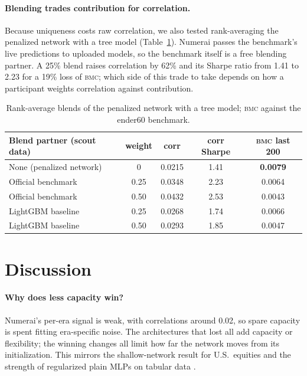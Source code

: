 \documentclass[11pt]{article}
\newcommand{\bmc}{\textsc{bmc}}
\begin{document}
\paragraph{Blending trades contribution for correlation.} Because uniqueness costs raw
correlation, we also tested rank-averaging the penalized network with a tree model
(Table~\ref{tab:blend}). Numerai passes the benchmark's live predictions to uploaded models, so
the benchmark itself is a free blending partner. A 25\% blend raises correlation by 62\% and its
Sharpe ratio from 1.41 to 2.23 for a 19\% loss of \bmc{}; which side of this trade to take
depends on how a participant weights correlation against contribution.

\begin{table}[t]
\centering\small
\begin{tabular}{lcccc}
\toprule
Blend partner (scout data) & weight & corr & corr Sharpe & \bmc{} last 200 \\
\midrule
None (penalized network) & 0 & 0.0215 & 1.41 & \textbf{0.0079} \\
Official benchmark & 0.25 & 0.0348 & 2.23 & 0.0064 \\
Official benchmark & 0.50 & 0.0432 & 2.53 & 0.0043 \\
LightGBM baseline & 0.25 & 0.0268 & 1.74 & 0.0066 \\
LightGBM baseline & 0.50 & 0.0293 & 1.85 & 0.0047 \\
\bottomrule
\end{tabular}
\caption{Rank-average blends of the penalized network with a tree model; \bmc{} against the
ender60 benchmark.}
\label{tab:blend}
\end{table}

\section{Discussion}

\paragraph{Why does less capacity win?} Numerai's per-era signal is weak, with correlations
around 0.02, so spare capacity is spent fitting era-specific noise. The architectures that lost
all add capacity or flexibility; the winning changes all limit how far the network moves from
its initialization. This mirrors the shallow-network result for U.S.\ equities
\citep{gu2020empirical} and the strength of regularized plain MLPs on tabular data
\citep{kadra2021well}.
\end{document}
